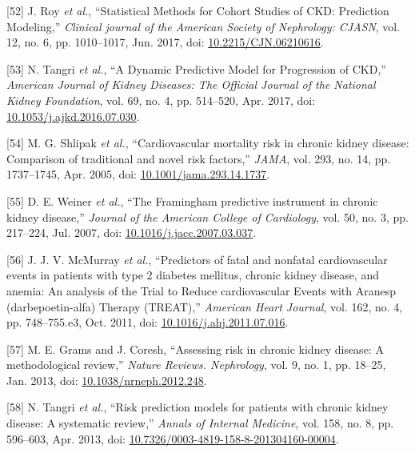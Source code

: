 \documentclass[12pt,PhD,twoside,openright]{muthesis}
\newenvironment{cslreferences}%
  {}%
  {\par}
\begin{document}
\begin{cslreferences}
\leavevmode\hypertarget{ref-roy_statistical_2017}{}%
{[}52{]} J. Roy \emph{et al.}, ``Statistical Methods for Cohort Studies of CKD: Prediction Modeling,'' \emph{Clinical journal of the American Society of Nephrology: CJASN}, vol. 12, no. 6, pp. 1010--1017, Jun. 2017, doi: \href{https://doi.org/10.2215/CJN.06210616}{10.2215/CJN.06210616}.

\leavevmode\hypertarget{ref-tangri_dynamic_2017}{}%
{[}53{]} N. Tangri \emph{et al.}, ``A Dynamic Predictive Model for Progression of CKD,'' \emph{American Journal of Kidney Diseases: The Official Journal of the National Kidney Foundation}, vol. 69, no. 4, pp. 514--520, Apr. 2017, doi: \href{https://doi.org/10.1053/j.ajkd.2016.07.030}{10.1053/j.ajkd.2016.07.030}.

\leavevmode\hypertarget{ref-shlipak_cardiovascular_2005}{}%
{[}54{]} M. G. Shlipak \emph{et al.}, ``Cardiovascular mortality risk in chronic kidney disease: Comparison of traditional and novel risk factors,'' \emph{JAMA}, vol. 293, no. 14, pp. 1737--1745, Apr. 2005, doi: \href{https://doi.org/10.1001/jama.293.14.1737}{10.1001/jama.293.14.1737}.

\leavevmode\hypertarget{ref-weiner_framingham_2007}{}%
{[}55{]} D. E. Weiner \emph{et al.}, ``The Framingham predictive instrument in chronic kidney disease,'' \emph{Journal of the American College of Cardiology}, vol. 50, no. 3, pp. 217--224, Jul. 2007, doi: \href{https://doi.org/10.1016/j.jacc.2007.03.037}{10.1016/j.jacc.2007.03.037}.

\leavevmode\hypertarget{ref-mcmurray_predictors_2011}{}%
{[}56{]} J. J. V. McMurray \emph{et al.}, ``Predictors of fatal and nonfatal cardiovascular events in patients with type 2 diabetes mellitus, chronic kidney disease, and anemia: An analysis of the Trial to Reduce cardiovascular Events with Aranesp (darbepoetin-alfa) Therapy (TREAT),'' \emph{American Heart Journal}, vol. 162, no. 4, pp. 748--755.e3, Oct. 2011, doi: \href{https://doi.org/10.1016/j.ahj.2011.07.016}{10.1016/j.ahj.2011.07.016}.

\leavevmode\hypertarget{ref-grams_assessing_2013}{}%
{[}57{]} M. E. Grams and J. Coresh, ``Assessing risk in chronic kidney disease: A methodological review,'' \emph{Nature Reviews. Nephrology}, vol. 9, no. 1, pp. 18--25, Jan. 2013, doi: \href{https://doi.org/10.1038/nrneph.2012.248}{10.1038/nrneph.2012.248}.

\leavevmode\hypertarget{ref-tangri_risk_2013}{}%
{[}58{]} N. Tangri \emph{et al.}, ``Risk prediction models for patients with chronic kidney disease: A systematic review,'' \emph{Annals of Internal Medicine}, vol. 158, no. 8, pp. 596--603, Apr. 2013, doi: \href{https://doi.org/10.7326/0003-4819-158-8-201304160-00004}{10.7326/0003-4819-158-8-201304160-00004}.


\end{cslreferences}
\end{document}
